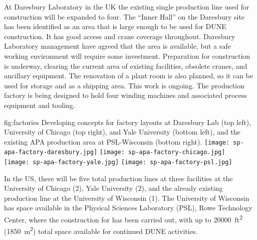 At Daresbury Laboratory in the UK the existing single production line used for  construction will be expanded to four.  The ``Inner Hall'' on the Daresbury site has been identified as an area that is large enough to be used for DUNE  construction. It has good access and crane coverage throughout. Daresbury Laboratory management have agreed that the area is available, but a safe working environment will require some investment. Preparation for construction is underway, clearing the current area of existing facilities, obsolete cranes, and ancillary equipment. The renovation of a plant room is also planned, so it can be used for storage and as a shipping area. This work is ongoing. The production factory is being designed to hold four winding machines and associated process equipment and tooling.  

\begin{dunefigure}{fig:factories}
{Developing concepts for factory layouts at Daresbury Lab (top left), University of Chicago (top right), and Yale University (bottom left), and the existing APA production area at PSL-Wisconsin (bottom right).}
\texttt{[image: sp-apa-factory-daresbury.jpg]} 
\texttt{[image: sp-apa-factory-chicago.jpg]} \\
\vspace{1mm}
\texttt{[image: sp-apa-factory-yale.jpg]}
\texttt{[image: sp-apa-factory-psl.jpg]} 
\end{dunefigure}

In the US, there will be five total production lines at three facilities at the University of Chicago (2), Yale University (2), and the already existing production line at the University of Wisconsin (1). The University of Wisconsin has space available in the Physical Sciences Laboratory (PSL), Rowe Technology Center, where the construction for  has been carried out, with up to \SI{20000}{ft^2} (\SI{1850}{m^2}) total space available for continued DUNE activities. 

